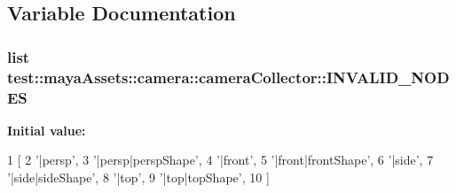 \subsection{\-Variable \-Documentation}
\hypertarget{namespacetest_1_1mayaAssets_1_1camera_1_1cameraCollector_ac313094b5e6b4be3b744f8fb11511aa6}{
\subsubsection[{\-I\-N\-V\-A\-L\-I\-D\-\_\-\-N\-O\-D\-E\-S}]{\setlength{\rightskip}{0pt plus 5cm}list {\bf test\-::maya\-Assets\-::camera\-::camera\-Collector\-::\-I\-N\-V\-A\-L\-I\-D\-\_\-\-N\-O\-D\-E\-S}}}\label{da/d7c/namespacetest_1_1mayaAssets_1_1camera_1_1cameraCollector_ac313094b5e6b4be3b744f8fb11511aa6}
{\bfseries \-Initial value\-:}
\begin{DoxyCode}
1 [
2     '|persp',
3     '|persp|perspShape',
4     '|front',
5     '|front|frontShape',
6     '|side',
7     '|side|sideShape',
8     '|top',
9     '|top|topShape',
10 ]
\end{DoxyCode}

